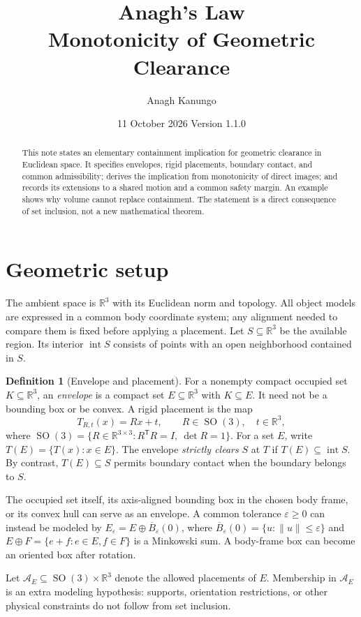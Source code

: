 \documentclass[11pt,a4paper]{article}
\title{Anagh's Law\\\large Monotonicity of Geometric Clearance}
\author{Anagh Kanungo}
\date{11 October 2026 \quad Version 1.1.0}
\theoremstyle{definition}
\newtheorem{definition}[theorem]{Definition}
\theoremstyle{remark}
\newcommand{\R}{\mathbb{R}}
\newcommand{\interior}{\operatorname{int}}
\newcommand{\SO}{\operatorname{SO}}
\begin{document}
\maketitle
\begin{abstract}
This note states an elementary containment implication for geometric clearance in Euclidean space. It specifies envelopes, rigid placements, boundary contact, and common admissibility; derives the implication from monotonicity of direct images; and records its extensions to a shared motion and a common safety margin. An example shows why volume cannot replace containment. The statement is a direct consequence of set inclusion, not a new mathematical theorem.
\end{abstract}

\section{Geometric setup}
The ambient space is $\R^3$ with its Euclidean norm and topology. All object models are expressed in a common body coordinate system; any alignment needed to compare them is fixed before applying a placement. Let $S\subseteq\R^3$ be the available region. Its interior $\interior S$ consists of points with an open neighborhood contained in $S$.

\begin{definition}[Envelope and placement]\label{def:setup}
For a nonempty compact occupied set $K\subseteq\R^3$, an \emph{envelope} is a compact set $E\subseteq\R^3$ with $K\subseteq E$. It need not be a bounding box or be convex. A rigid placement is the map
\[
T_{R,t}(x)=Rx+t,\qquad R\in\SO(3),\quad t\in\R^3,
\]
where $\SO(3)=\{R\in\R^{3\times3}:R^{\mathsf T}R=I,\ \det R=1\}$. For a set $E$, write $T(E)=\{T(x):x\in E\}$. The envelope \emph{strictly clears} $S$ at $T$ if $T(E)\subseteq\interior S$. By contrast, $T(E)\subseteq S$ permits boundary contact when the boundary belongs to $S$.
\end{definition}

The occupied set itself, its axis-aligned bounding box in the chosen body frame, or its convex hull can serve as an envelope. A common tolerance $\varepsilon\geq0$ can instead be modeled by $E_\varepsilon=E\oplus\overline B_\varepsilon(0)$, where $\overline B_\varepsilon(0)=\{u:\|u\|\leq\varepsilon\}$ and $E\oplus F=\{e+f:e\in E,f\in F\}$ is a Minkowski sum. A body-frame box can become an oriented box after rotation.

Let $\mathcal A_E\subseteq\SO(3)\times\R^3$ denote the allowed placements of $E$. Membership in $\mathcal A_E$ is an extra modeling hypothesis: supports, orientation restrictions, or other physical constraints do not follow from set inclusion.
\end{document}
